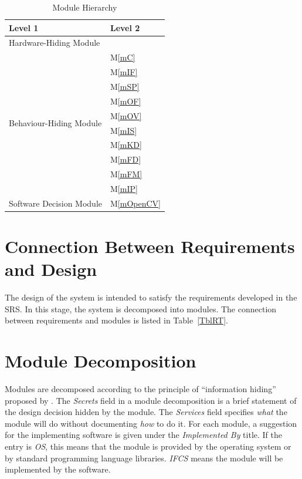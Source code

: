 \documentclass[12pt, titlepage]{article}
\newcommand{\mref}[1]{M\ref{#1}}
\begin{document}
\begin{table}[h!]
\centering
\begin{tabular}{p{} p{}}
\toprule
\textbf{Level 1} & \textbf{Level 2}\\
\midrule

{Hardware-Hiding Module} & ~ \\
\midrule

\multirow{10}{0.3\textwidth}{Behaviour-Hiding Module} & \mref{mC}\\ 
& \mref{mIF}\\
& \mref{mSP}\\
& \mref{mOF}\\
& \mref{mOV}\\
& \mref{mIS}\\
& \mref{mKD}\\ 
& \mref{mFD}\\
& \mref{mFM}\\
& \mref{mIP}\\
\midrule

\multirow{1}{0.3\textwidth}{Software Decision Module} & \mref{mOpenCV}\\

\bottomrule

\end{tabular}
\caption{Module Hierarchy}
\label{TblMH}
\end{table}

\section{Connection Between Requirements and Design} \label{SecConnection}

The design of the system is intended to satisfy the requirements developed in
the SRS. In this stage, the system is decomposed into modules. The connection
between requirements and modules is listed in Table~\ref{TblRT}.

\section{Module Decomposition} \label{SecMD}

Modules are decomposed according to the principle of ``information hiding''
proposed by \citet{ParnasEtAl1984}. The \emph{Secrets} field in a module
decomposition is a brief statement of the design decision hidden by the
module. The \emph{Services} field specifies \emph{what} the module will do
without documenting \emph{how} to do it. For each module, a suggestion for the
implementing software is given under the \emph{Implemented By} title. If the
entry is \emph{OS}, this means that the module is provided by the operating
system or by standard programming language libraries.  \emph{IFCS} means the
module will be implemented by the \progname{} software.
\end{document}
